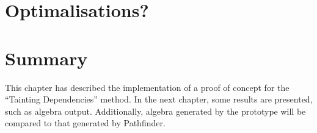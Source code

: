







\section{Optimalisations?}

\section{Summary}
\label{sect:impl:summary}
This chapter has described the implementation of a proof of concept for the
``Tainting Dependencies'' method. In the next chapter, some results are
presented, such as algebra output. Additionally, algebra generated by the
prototype will be compared to that generated by Pathfinder.
